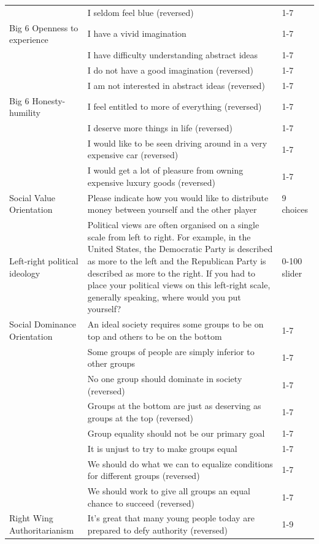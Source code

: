 \documentclass[
  man,floatsintext]{apa6}
\newenvironment{lltable}{\begin{landscape}\centering\begin{ThreePartTable}}{\end{ThreePartTable}\end{landscape}}
\begin{document}
\begin{lltable}
\begin{longtable}{p{6cm}p{11cm}p{3cm}}
 & I seldom feel blue (reversed) & 1-7\\
Big 6 Openness to experience & I have a vivid imagination & 1-7\\
 & I have difficulty understanding abstract ideas & 1-7\\
 & I do not have a good imagination (reversed) & 1-7\\
 & I am not interested in abstract ideas (reversed) & 1-7\\
Big 6 Honesty-humility & I feel entitled to more of everything (reversed) & 1-7\\
 & I deserve more things in life (reversed) & 1-7\\
 & I would like to be seen driving around in a very expensive car (reversed) & 1-7\\
 & I would get a lot of pleasure from owning expensive luxury goods (reversed) & 1-7\\
Social Value Orientation & Please indicate how you would like to distribute money between yourself and the other player & 9 choices\\
Left-right political ideology & Political views are often organised on a single scale from left to right. For example, in the United States, the Democratic Party is described as more to the left and the Republican Party is described as more to the right. If you had to place your political views on this left-right scale, generally speaking, where would you put yourself? & 0-100 slider\\
Social Dominance Orientation & An ideal society requires some groups to be on top and others to be on the bottom & 1-7\\
 & Some groups of people are simply inferior to other groups & 1-7\\
 & No one group should dominate in society (reversed) & 1-7\\
 & Groups at the bottom are just as deserving as groups at the top (reversed) & 1-7\\
 & Group equality should not be our primary goal & 1-7\\
 & It is unjust to try to make groups equal & 1-7\\
 & We should do what we can to equalize conditions for different groups (reversed) & 1-7\\
 & We should work to give all groups an equal chance to succeed (reversed) & 1-7\\
Right Wing Authoritarianism & It's great that many young people today are prepared to defy authority (reversed) & 1-9\\

\end{longtable}
\end{lltable}
\end{document}
